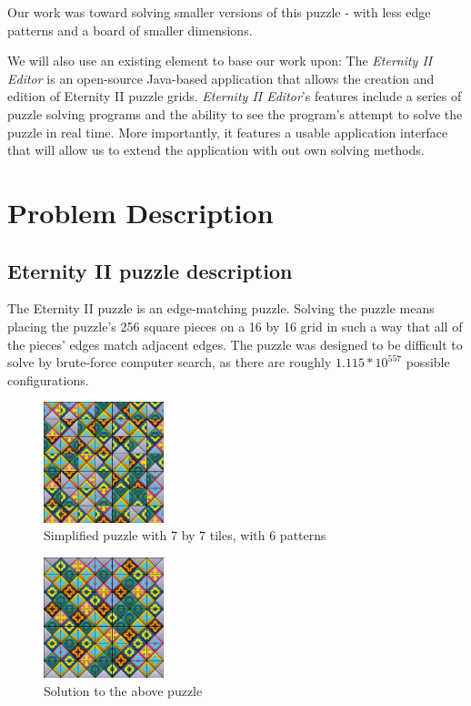 \documentclass{llncs}
\begin{document}

Our work was toward solving smaller versions of this puzzle - with less edge patterns and a board of smaller dimensions.

We will also use an existing element to base our work upon: The \textit{Eternity II Editor} is an open-source Java-based application that allows the creation and edition of Eternity II puzzle grids. \textit{Eternity II Editor}'s features include a series of puzzle solving programs and the ability to see the program's attempt to solve the puzzle in real time. More importantly, it features a usable application interface that will allow us to extend the application with out own solving methods.

\section{Problem Description}\label{sec:problem_description}

\subsection{Eternity II puzzle description}\label{sec:puzzle_description}

The Eternity II puzzle is an edge-matching puzzle. Solving the puzzle means placing the puzzle's 256 square pieces on a 16 by 16  grid in such a way that all of the pieces' edges match adjacent edges. The puzzle was designed to be difficult to solve by brute-force computer search, as there are roughly $1.115 * 10 ^ {557}$ possible configurations.

\begin{figure}[H]
  \centering
  \includegraphics[width=35mm]{images/shuffled.png}
  \caption{Simplified puzzle with 7 by 7 tiles, with 6 patterns}
  \label{fig:shuffled_example}
\end{figure}

\begin{figure}[H]
  \centering
  \includegraphics[width=35mm]{images/solved.png}
  \caption{Solution to the above puzzle}
  \label{fig:solved_example}
\end{figure}
\end{document}
